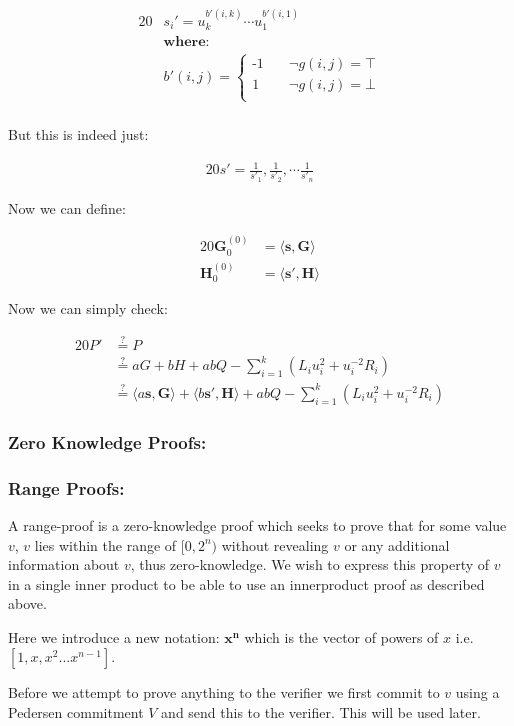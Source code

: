 \documentclass{article}
\newcommand{\eq}[1]{\begin{alignat*}{20}#1\end{alignat*}}
\renewcommand{\vec}[1]{\boldsymbol{#1}}
\newcommand{\dotp}[2]{\langle #1, #2 \rangle}
\begin{document}
\eq{
	&s_i' = u^{b'(i,k)}_k \cdots u^{b'(i,1)}_1 \\
	&\textbf{where:} \\
	&b'(i,j) = 
	\begin{cases}
		\text{-1} &\quad  \lnot g(i,j) = \top \\
		\text{1}  &\quad  \lnot g(i,j) = \bot \\
	\end{cases} \\
}

But this is indeed just:

\eq{
	s' = \frac{1}{s'_1}, \frac{1}{s'_2}, \cdots \frac{1}{s'_n}
}

Now we can define:

\eq{
	\vec{G}^{(0)}_0 &= \dotp{\vec{s}}{\vec{G}} \\
	\vec{H}^{(0)}_0 &= \dotp{\vec{s'}}{\vec{H}}
}

Now we can simply check:

\eq{
	P' &\stackrel{?}{=} P \\
	   &\stackrel{?}{=} aG + bH + abQ - \sum^k_{i=1} (L_i u^2_i + u^{-2}_i R_i) \\
	   &\stackrel{?}{=} \dotp{a\vec{s}}{\vec{G}} + \dotp{b\vec{s'}}{\vec{H}} + abQ - \sum^k_{i=1} (L_i u^2_i + u^{-2}_i R_i)
}

\subsubsection{Zero Knowledge Proofs:}\label{zero-knowledge}

\subsubsection{Range Proofs:}\label{range-proofs}

A range-proof is a zero-knowledge proof which seeks to prove that for some value $v$, $v$ lies within the range of $[0,2^n)$ without revealing $v$ or any additional information about $v$, thus zero-knowledge. We wish to express this property of $v$ in a single inner product to be able to use an innerproduct proof as described above. 

Here we introduce a new notation: $\vec{x^n}$ which is the vector of powers of $x$ i.e. $[1,x,x^2... x^{n-1}]$.

Before we attempt to prove anything to the verifier we first commit to $v$ using a Pedersen commitment $V$ and send this to the verifier. This will be used later.
\end{document}
